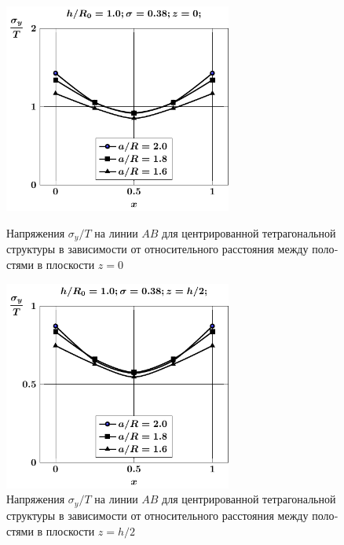 \begin{russian}
\begin{figure}[h!]
\centering\footnotesize
\parbox[b]{7.5cm}{\centering\includegraphics[width=7.5cm]{cav5-a-h10-r10-z0-sig_y.pdf}
\caption{Напряжения $\sigma_y/T$ на линии $AB$ для центрированной тетрагональной структуры в зависимости от относительного расстояния между полостями в плоскости $z=0$ 
\label{f:7:97}}}\hfil\hfil
\parbox[b]{7.5cm}{\centering\includegraphics[width=7.5cm]{cav5-a-h10-r10-z1-sig_y.pdf}
\caption{Напряжения $\sigma_y/T$ на линии $AB$ для центрированной тетрагональной структуры в зависимости от относительного расстояния между полостями в плоскости $z=h/2$
\label{f:7:98}}}
\end{figure}


\end{russian}
